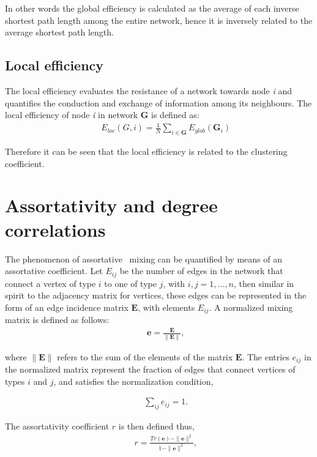 In other words the global efficiency is calculated as the average of each inverse shortest path length among the entire network, hence it is inversely related to the average shortest path length.

\subsection{Local efficiency}
The local efficiency evaluates the resistance of a network towards node \textit{i} and quantifies the conduction and exchange of information among its neighbours. The local efficiency of node \textit{i} in network \textbf{G} is defined as:
\begin{eqnarray}
&&E_{loc}(G, i)=\frac{1}{N} \sum_{i \in \textbf{G}} E_{glob}(\textbf{G}_i)
\end{eqnarray}

Therefore it can be seen that the local efficiency is related to the clustering coefficient.

\section{Assortativity and degree correlations}

The phenomenon of assortative~\cite{newman2002assortative} mixing can be quantified by means of an assortative
coefficient. Let $E_{ij}$ be the number of edges in the network that connect
a vertex of type $i$ to one of type $j$, with $i, j=1, . . . , n$, then similar in spirit to the
adjacency matrix for vertices, these edges can be represented in the form of an edge
incidence matrix $\mathbf{E}$, with elements $E_{ij}$. A normalized mixing matrix is defined as follows:
\begin{eqnarray}
&&\mathbf{e}=\frac{\mathbf{E}}{\|\mathbf{E}\|},
\end{eqnarray}

where $\|\mathbf{E}\|$ refers to the sum of the elements of the matrix $\mathbf{E}$. The entries $e_{ij}$ in the normalized matrix represent the fraction of edges that connect vertices of types $i$ and $j$, and satisfies the normalization condition,

\begin{eqnarray}
&&\sum_{ij}e_{ij}=1.
\end{eqnarray}

The assortativity coefficient $r$ is then defined thus,
\begin{eqnarray}
&&r=\frac{Tr(\mathbf{e})-\|\mathbf{e}\|^2}{1-\|\mathbf{e}\|^2},\label{con:degreecorr}
\end{eqnarray}

